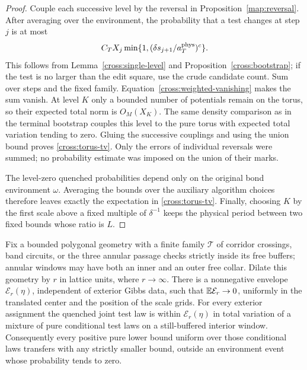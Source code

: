 \begin{proof}
Couple each successive level by the reversal in
Proposition~\ref{map:reversal}.  After averaging over the environment,
the probability that a test changes at step $j$ is at most
\[
 C_TX_j\min\{1,(\delta s_{j+1}/a_T^{\rm phys})^c\}.
\]
This follows from Lemma~\ref{cross:single-level} and
Proposition~\ref{cross:bootstrap}; if the test is no larger than the
edit square, use the crude candidate count.  Sum over steps and the
fixed family.  Equation~\eqref{cross:weighted-vanishing} makes the sum
vanish.  At level $K$ only a bounded number of potentials remain on
the torus, so their expected total norm is $O_M(X_K)$.  The same density
comparison as in the terminal bootstrap couples this level to the pure
torus with expected total variation tending to zero.  Gluing the
successive couplings and using the union bound proves
\eqref{cross:torus-tv}.  Only the errors of individual reversals were
summed; no probability estimate was imposed on the union of their marks.

The level-zero quenched probabilities depend only on the original bond
environment $\omega$.  Averaging the bounds over the auxiliary algorithm
choices therefore leaves exactly the expectation in
\eqref{cross:torus-tv}.  Finally, choosing $K$ by the first scale above
a fixed multiple of $\delta^{-1}$ keeps the physical period between two
fixed bounds whose ratio is $L$.
\end{proof}

\begin{proposition}
\label{cross:local-comparison}
Fix a bounded polygonal geometry with a finite family $\mathcal T$ of
corridor crossings, band circuits, or the three annular passage checks
strictly inside its free buffers; annular windows may have both
an inner and an outer free collar.  Dilate this geometry by $r$ in
lattice units, where $r\to\infty$.  There is a nonnegative envelope
$\mathcal E_r(\eta)$, independent of exterior Gibbs data, such that
$\mathbb E\mathcal E_r\to0$, uniformly in the translated center and the position
of the scale grids.  For every exterior assignment the quenched joint
test law is within $\mathcal E_r(\eta)$ in total variation of a mixture
of pure conditional test laws on a still-buffered interior window.
Consequently every positive pure lower bound uniform over those
conditional laws transfers with any strictly smaller bound, outside
an environment event whose probability tends to zero.
\end{proposition}

